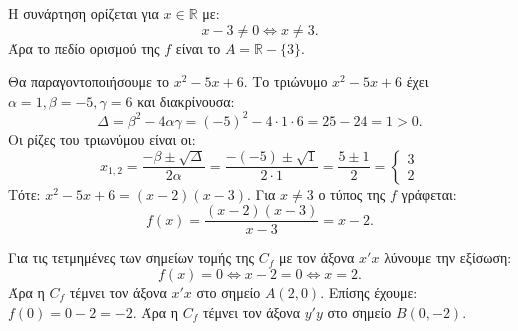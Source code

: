 
\begin{alist}
\item Η συνάρτηση ορίζεται για $x \in \mathbb{R}$ με:
\[x - 3 \ne 0 \Leftrightarrow x \ne 3.\]
Άρα το πεδίο ορισμού της $f$ είναι το $A = \mathbb{R} - \{3\}$.

\item Θα παραγοντοποιήσουμε το $x^2 - 5x + 6$.
Το τριώνυμο $x^2 - 5x + 6$ έχει $\alpha = 1, \beta = -5, \gamma = 6$ και διακρίνουσα:
\[\Delta = \beta^2 - 4\alpha\gamma = (-5)^2 - 4 \cdot 1 \cdot 6 = 25 - 24 = 1 > 0.\]
Οι ρίζες του τριωνύμου είναι οι:
\[x_{1,2} = \dfrac{-\beta \pm \sqrt{\Delta}}{2\alpha} = \dfrac{-(-5) \pm \sqrt{1}}{2 \cdot 1} = \dfrac{5 \pm 1}{2} = \begin{cases} 3 \\ 2 \end{cases}\]
Τότε:
$x^2 - 5x + 6 = (x - 2)(x - 3)$.
Για $x \ne 3$ ο τύπος της $f$ γράφεται:
\[f(x) = \dfrac{(x - 2)(x - 3)}{x - 3} = x - 2.\]

\item Για τις τετμημένες των σημείων τομής της $C_f$ με τον άξονα $x'x$ λύνουμε την εξίσωση:
\[f(x) = 0 \Leftrightarrow x - 2 = 0 \Leftrightarrow x = 2.\]
Άρα η $C_f$ τέμνει τον άξονα $x'x$ στο σημείο $A(2, 0)$.
Επίσης έχουμε:
$f(0) = 0 - 2 = -2$.
Άρα η $C_f$ τέμνει τον άξονα $y'y$ στο σημείο $B(0, -2)$.
\end{alist}

